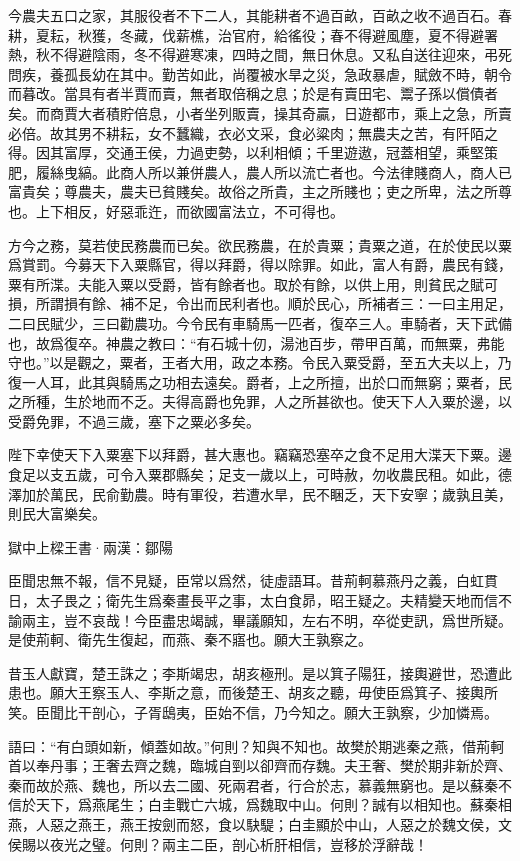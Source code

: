 \documentclass[12pt,a4paper]{ctexbook}
\begin{document}
今農夫五口之家，其服役者不下二人，其能耕者不過百畝，百畝之收不過百石。春耕，夏耘，秋獲，冬藏，伐薪樵，治官府，給徭役；春不得避風塵，夏不得避署熱，秋不得避陰雨，冬不得避寒凍，四時之間，無日休息。又私自送往迎來，弔死問疾，養孤長幼在其中。勤苦如此，尚覆被水旱之災，急政暴虐，賦斂不時，朝令而暮改。當具有者半賈而賣，無者取倍稱之息；於是有賣田宅、鬻子孫以償債者矣。而商賈大者積貯倍息，小者坐列販賣，操其奇贏，日遊都市，乘上之急，所賣必倍。故其男不耕耘，女不蠶織，衣必文采，食必粱肉；無農夫之苦，有阡陌之得。因其富厚，交通王侯，力過吏勢，以利相傾；千里遊遨，冠蓋相望，乘堅策肥，履絲曳縞。此商人所以兼併農人，農人所以流亡者也。今法律賤商人，商人已富貴矣；尊農夫，農夫已貧賤矣。故俗之所貴，主之所賤也；吏之所卑，法之所尊也。上下相反，好惡乖迕，而欲國富法立，不可得也。\par
方今之務，莫若使民務農而已矣。欲民務農，在於貴粟；貴粟之道，在於使民以粟爲賞罰。今募天下入粟縣官，得以拜爵，得以除罪。如此，富人有爵，農民有錢，粟有所渫。夫能入粟以受爵，皆有餘者也。取於有餘，以供上用，則貧民之賦可損，所謂損有餘、補不足，令出而民利者也。順於民心，所補者三：一曰主用足，二曰民賦少，三曰勸農功。今令民有車騎馬一匹者，復卒三人。車騎者，天下武備也，故爲復卒。神農之教曰：“有石城十仞，湯池百步，帶甲百萬，而無粟，弗能守也。”以是觀之，粟者，王者大用，政之本務。令民入粟受爵，至五大夫以上，乃復一人耳，此其與騎馬之功相去遠矣。爵者，上之所擅，出於口而無窮；粟者，民之所種，生於地而不乏。夫得高爵也免罪，人之所甚欲也。使天下人入粟於邊，以受爵免罪，不過三歲，塞下之粟必多矣。\par
陛下幸使天下入粟塞下以拜爵，甚大惠也。竊竊恐塞卒之食不足用大渫天下粟。邊食足以支五歲，可令入粟郡縣矣；足支一歲以上，可時赦，勿收農民租。如此，德澤加於萬民，民俞勤農。時有軍役，若遭水旱，民不睏乏，天下安寧；歲孰且美，則民大富樂矣。\par
獄中上樑王書·兩漢：鄒陽 \par
臣聞忠無不報，信不見疑，臣常以爲然，徒虛語耳。昔荊軻慕燕丹之義，白虹貫日，太子畏之；衛先生爲秦畫長平之事，太白食昴，昭王疑之。夫精變天地而信不諭兩主，豈不哀哉！今臣盡忠竭誠，畢議願知，左右不明，卒從吏訊，爲世所疑。是使荊軻、衛先生復起，而燕、秦不寤也。願大王孰察之。\par
昔玉人獻寶，楚王誅之；李斯竭忠，胡亥極刑。是以箕子陽狂，接輿避世，恐遭此患也。願大王察玉人、李斯之意，而後楚王、胡亥之聽，毋使臣爲箕子、接輿所笑。臣聞比干剖心，子胥鴟夷，臣始不信，乃今知之。願大王孰察，少加憐焉。\par
語曰：“有白頭如新，傾蓋如故。”何則？知與不知也。故樊於期逃秦之燕，借荊軻首以奉丹事；王奢去齊之魏，臨城自剄以卻齊而存魏。夫王奢、樊於期非新於齊、秦而故於燕、魏也，所以去二國、死兩君者，行合於志，慕義無窮也。是以蘇秦不信於天下，爲燕尾生；白圭戰亡六城，爲魏取中山。何則？誠有以相知也。蘇秦相燕，人惡之燕王，燕王按劍而怒，食以駃騠；白圭顯於中山，人惡之於魏文侯，文侯賜以夜光之璧。何則？兩主二臣，剖心析肝相信，豈移於浮辭哉！\par
\end{document}
